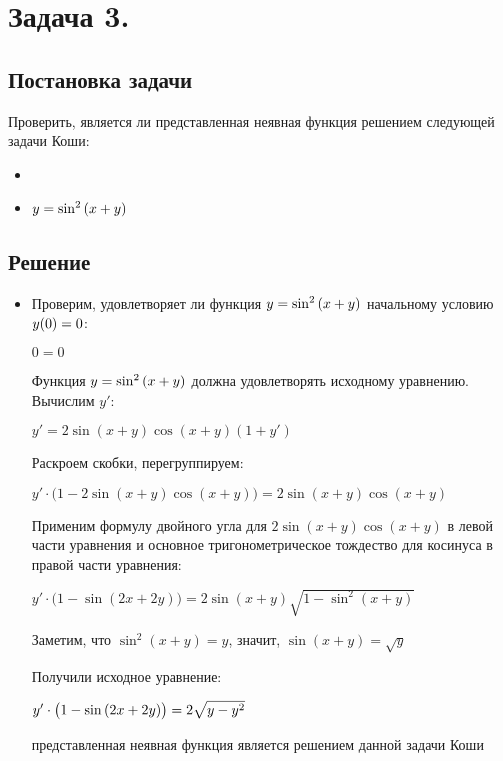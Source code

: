 

\section{Задача 3.}
\subsection{Постановка задачи}
Проверить, является ли представленная неявная функция решением следующей задачи Коши:
\begin{itemize}[label={}]
	\item
		\customCases
			{\equation}
			{\condition}
	\item
		$ y = \sin^{2}{(x + y)} $
\end{itemize}

\subsection{Решение}

\doublespacing

\begin{itemize}[label={}]
	\item
		Проверим, удовлетворяет ли функция $ y = \sin^{2}{(x + y)} $ начальному условию $ y\mathopen{}\left( {0}_{{}_{}}\,\negthickspace\right)\mathclose{} = 0 $:
		
		\subitem 
			$ 0 = 0 $
		
		Функция $ y = \sin^{2}{(x + y)} $ должна удовлетворять исходному уравнению.
		Вычислим $ y' $:
		
		\subitem 
			$ {y}' = 2\sin{(x + y)}\cos{(x + y)}(1 + {y}') $
			
		Раскроем скобки, перегруппируем:	
			
		\subitem	
			$ {y}' \cdot \big(1 - 2\sin{(x + y)}\cos{(x + y)}\big) = 2\sin{(x + y)}\cos{(x + y)} $
			
		Применим формулу двойного угла для $ 2\sin{(x + y)}\cos{(x + y)} $ 
		в левой части уравнения и основное тригонометрическое тождество для косинуса 
		в правой части уравнения:
		
		\subitem 
			$ {y}' \cdot \big(1 - \sin{(2x + 2y)}\big) = 2\sin{(x + y)}\sqrt{1 - \sin^2{(x + y)}} $
			
		Заметим, что $ \sin^2(x + y) = {y} $, значит, $ \sin{(x+y)} = \sqrt{y} $
		
		Получили исходное уравнение:
		
		\subitem
			$ {y}' \cdot \mathopen{}\left( {1 - \sin{(2x + 2y)}}_{{}_{}}\,\negthickspace\right)\mathclose{} = 2\sqrt{y - y^{2}} $
			
		\answer представленная неявная функция является решением данной задачи Коши
\end{itemize}

\singlespacing
